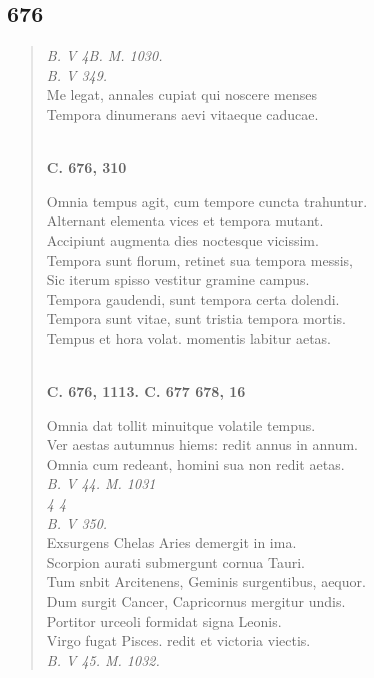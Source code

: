 \documentclass[11pt, a4paper]{report}
\begin{document}
            \subsection*{676}
      \begin{verse}
      \textit{B. V 4B. M. 1030.} \\ \textit{B. V 349.} \\ Me legat, annales cupiat qui noscere menses \\ Tempora dinumerans aevi vitaeque caducae. \\ 
        ﻿\pagebreak 
    \begin{center} \textbf{C. 676, 310} \end{center}Omnia tempus agit, cum tempore cuncta trahuntur. \\ Alternant elementa vices et tempora mutant. \\ Accipiunt augmenta dies noctesque vicissim. \\ Tempora sunt florum, retinet sua tempora messis, \\ Sic iterum spisso vestitur gramine campus. \\ Tempora gaudendi, sunt tempora certa dolendi. \\ Tempora sunt vitae, sunt tristia tempora mortis. \\ Tempus et hora volat. momentis labitur aetas. \\ 
        ﻿\pagebreak 
    \begin{center} \textbf{C. 676, 1113. C. 677 678, 16} \end{center} \marginpar{[153]} Omnia dat tollit minuitque volatile tempus. \\ Ver aestas autumnus hiems: redit annus in annum. \\ Omnia cum redeant, homini sua non redit aetas. \\ \textit{B. V 44. M. 1031} \\ \textit{4 4} \\ \textit{B. V 350.} \\ Exsurgens Chelas Aries demergit in ima. \\ Scorpion aurati submergunt cornua Tauri. \\ Tum snbit Arcitenens, Geminis surgentibus, aequor. \\ Dum surgit Cancer, Capricornus mergitur undis. \\ Portitor urceoli formidat signa Leonis. \\ Virgo fugat Pisces. redit et victoria viectis. \\ \textit{B. V 45. M. 1032.} \\ 
      \end{verse}
  
\end{document}
